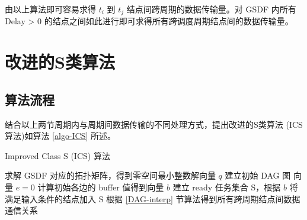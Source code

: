 
由以上算法即可容易求得 $t_i$ 到 $t_j$ 结点间跨周期的数据传输量。对 GSDF 内所有 Delay > 0 的结点之间如此进行即可求得所有跨调度周期结点间的数据传输量。

\section{改进的S类算法}
\subsection{算法流程}
结合以上两节周期内与周期间数据传输的不同处理方式，提出改进的S类算法 (ICS 算法)如算法 \ref{algo-ICS} 所述。
\begin{algorithm}
  \caption{Improved Class S (ICS) 算法}
  \label{algo-ICS}
  求解 GSDF 对应的拓扑矩阵，得到零空间最小整数解向量 $q$\;
  建立初始 DAG 图\;
  向量 $e = 0$\;
  计算初始各边的 buffer 值得到向量 $b$\;
  建立 ready 任务集合 S，根据 $b$ 将满足输入条件的结点加入 S\;
  根据 \ref{DAG-interp} 节算法得到所有跨周期结点间数据通信关系\;
\end{algorithm}


